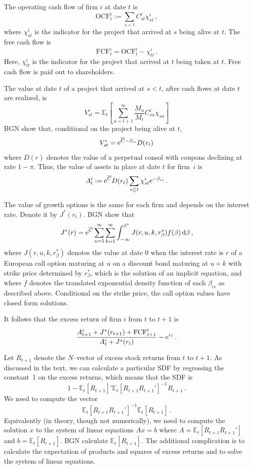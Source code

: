 \documentclass[12pt]{scrarticle}
\begin{document}
\begin{appendices}
The operating cash flow of firm $i$ at date $t$ is
$$\text{OCF}^i_t :=\sum_{s<t} C^{i}_{st}\chi^i_{st}\,,$$
where $\chi^i_{st}$ is the indicator for the project that arrived at $s$ being alive at $t$.
The free cash flow is 
$$\text{FCF}^i_t = \text{OCF}^i_t - \chi^i_{tt}\,.$$
Here, $\chi^i_{tt}$ is the indicator for the project that arrived at $t$ being taken at $t$.  Free cash flow is paid out to shareholders.

The value at date $t$ of a project that arrived at $s<t$, after cash flows at date $t$ are realized, is
$$V_{st}^i = \mathbb{E}_t \left[\sum_{u=t+1}^\infty \frac{M_u}{M_t}C_{su}^i \chi_{su}\right]$$
BGN show that, conditional on the project being alive at $t$, 
$$V_{st}^i = \mathrm{e}^{\overline{C} - \beta_{is}}D(r_t)$$
where $D(r)$ denotes the value of a perpetual consol with coupons declining at rate $1-\pi$.  Thus, the value of assets in place at date $t$ for firm~$i$ is
$$A^i_t :=\mathrm{e}^{\overline{C}}D(r_t)\sum_{s\le t}\chi^i_{st}\mathrm{e}^{-\beta_{is}}\,.$$

The value of growth options is the same for each firm and depends on the interest rate.  Denote it by $J^*(r_t)$.  BGN show that 
\begin{equation}
J^*(r) = \mathrm{e}^{\overline{C}}\sum_{u=1}^\infty \sum_{k=1}^\infty \int_{-\infty}^{\beta^*} J(r, u, k, r^*_{\beta})f(\beta)\,\mathrm{d} \beta\,,
\end{equation}
where $J(r, u, k, r^*_\beta)$ denotes the value at date 0 when the interest rate is $r$ of a European call option maturing at $u$ on a discount bond maturing at $u+k$ with strike price determined by $r^*_\beta$, which is the solution of an implicit equation, and where $f$ denotes the translated exponential density function of each $\beta_{is}$ as described above.  Conditional on the strike price, the call option values have closed form solutions. 

It follows that the excess return of firm $i$ from $t$ to $t+1$ is 
\begin{equation}
\frac{A^i_{t+1} + J^*(r_{t+1}) + \text{FCF}^i_{t+1}}{A^i_t + J^*(r_t)} - \mathrm{e}^{r_t}\,.
\end{equation}

Let $R_{t+1}$ denote the $N$--vector of excess stock returns from $t$ to $t+1$.  As discussed in the text, we can calculate a particular SDF by regressing the constant~1 on the excess returns, which means that the SDF is
$$1 - \mathbb{E}_t[R_{t+1}]'\mathbb{E}_t[R_{t+1}R_{t+1}']^{-1}R_{t+1}\,.$$
We need to compute the vector
$$\mathbb{E}_t[R_{t+1}R_{t+1}']^{-1}\mathbb{E}_t[R_{t+1}]\,.$$
Equivalently (in theory, though not numerically), we need to compute the solution $x$ to the system of linear equations $Ax=b$ where $A=\mathbb{E}_t[R_{t+1}R_{t+1}']$ and $b = \mathbb{E}_t[R_{t+1}]$.
BGN calculate $\mathbb{E}_t[R_{t+1}]$.  The additional complication is to calculate the expectation of products and squares of excess returns and to solve the system of linear equations.


\end{appendices}
\end{document}
